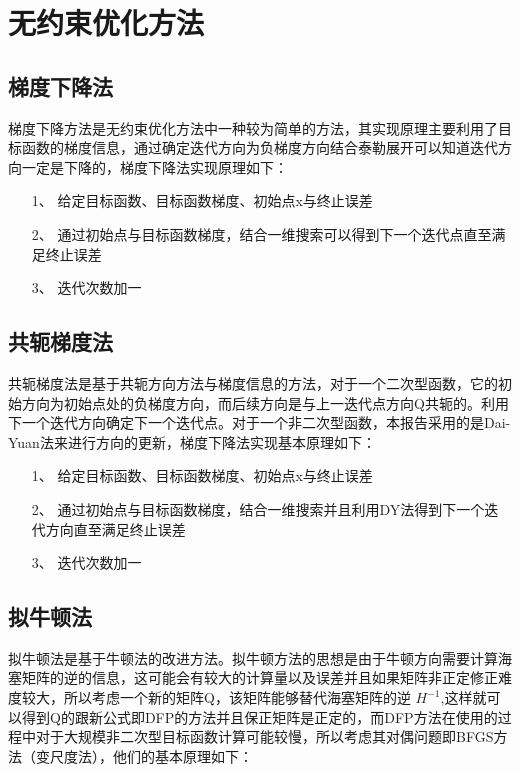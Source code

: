 \section{无约束优化方法}
\subsection{梯度下降法}
梯度下降方法是无约束优化方法中一种较为简单的方法，其实现原理主要利用了目标函数的梯度信息，通过确定迭代方向为负梯度方向结合泰勒展开可以知道迭代方向一定是下降的，梯度下降法实现原理如下：

\begin{itemize}
    \item[1、] 给定目标函数、目标函数梯度、初始点x与终止误差
    \item[2、] 通过初始点与目标函数梯度，结合一维搜索可以得到下一个迭代点直至满足终止误差
    \item[3、] 迭代次数加一
\end{itemize}

\subsection{共轭梯度法}
共轭梯度法是基于共轭方向方法与梯度信息的方法，对于一个二次型函数，它的初始方向为初始点处的负梯度方向，而后续方向是与上一迭代点方向Q共轭的。利用下一个迭代方向确定下一个迭代点。对于一个非二次型函数，本报告采用的是Dai-Yuan法来进行方向的更新，梯度下降法实现基本原理如下：

\begin{itemize}
    \item[1、] 给定目标函数、目标函数梯度、初始点x与终止误差
    \item[2、] 通过初始点与目标函数梯度，结合一维搜索并且利用DY法得到下一个迭代方向直至满足终止误差
    \item[3、] 迭代次数加一
\end{itemize}

\subsection{拟牛顿法}
拟牛顿法是基于牛顿法的改进方法。拟牛顿方法的思想是由于牛顿方向需要计算海塞矩阵的逆的信息，这可能会有较大的计算量以及误差并且如果矩阵非正定修正难度较大，所以考虑一个新的矩阵Q，该矩阵能够替代海塞矩阵的逆 $H^{-1}$,这样就可以得到Q的跟新公式即DFP的方法并且保正矩阵是正定的，而DFP方法在使用的过程中对于大规模非二次型目标函数计算可能较慢，所以考虑其对偶问题即BFGS方法（变尺度法），他们的基本原理如下：


